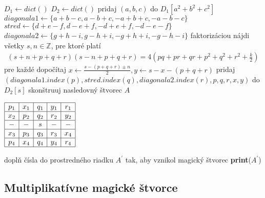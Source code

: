 \begin{algorithmic}
\STATE $D_1 \gets dict()$
\STATE $D_2 \gets dict()$
    \STATE pridaj $(a,b,c)$ do $D_1[a^2 + b^2 + c^2]$
\ENDFOR
{}
	  \STATE $diagonala1 \gets \{a+b-c, a-b+c, -a+b+c, -a-b-c\}$
	  \STATE $stred \gets \{d+e-f, d-e+f, -d+e+f, -d-e-f\}$
	  \STATE $diagonala2 \gets \{g+h-i,g-h+i,-g+h+i,-g-h-i\}$
		\STATE faktorizáciou nájdi všetky $s,n \in \mathbb{Z}$, pre ktoré platí
				\begin{gather*}
				(s+n+p+q+r)(s-n+p+q+r) = 4(pq + pr + qr + p^2 + q^2 + r^2 + \frac{k}{2})
				\end{gather*}
		\STATE pre každé dopočítaj $x \gets \frac{s - (p+q+r) \pm n}{2}, y \gets s - x - (p+q+r)$
			\STATE pridaj $(diagonala1.index(p),stred.index(q),diagonala2.index(r), p, q, r, x, y)$ do $D_2[s]$
		\ENDIF
	  \ENDFOR
    \ENDFOR
\ENDFOR
{}
		\STATE skonštruuj nasledovný štvorec $A$
		\begin{center}
		$\begin{array}{ |c|c|c|c|c| }
		\hline
		p_1 & x_1 & q_1 & y_1 & r_1 \\ 
		\hline
		x_2 & p_2 & q_2 & r_2 & y_2  \\ 
		\hline
		- & - & s & - & - \\ 
		\hline
		x_3 & p_3 & q_3 & r_3 & x_4 \\ 
		\hline
		p_4 & x_4 & q_4 & y_4 & r_4 \\
		\hline
		\end{array}$
		\end{center}

			\STATE doplň čísla do prostredného riadku $A^\prime$ tak, aby vznikol magický štvorec
				\STATE \textbf{print}($A^\prime$)
			\ENDIF
		\ENDFOR
	  \ENDIF
    \ENDFOR
\ENDFOR
\end{algorithmic}

\subsection{Multiplikatívne magické štvorce} 

